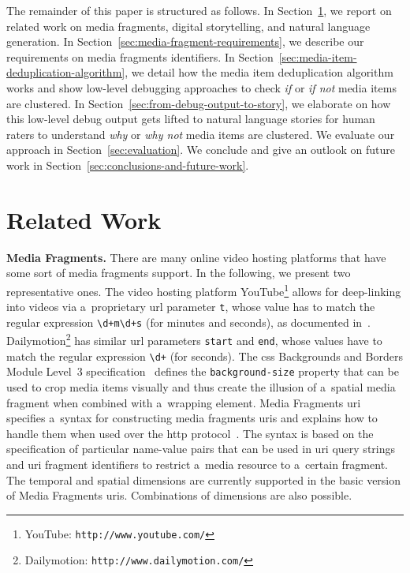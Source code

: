 \documentclass{article}
\begin{document}
The remainder of this paper is structured as follows. In Section~\ref{sec:related-work}, we report on related work on media fragments, digital storytelling, and natural language generation. In Section~\ref{sec:media-fragment-requirements}, we describe our requirements on media fragments identifiers. In Section~\ref{sec:media-item-deduplication-algorithm}, we detail how the media item deduplication algorithm works and show low-level debugging approaches to check
\emph{if} or \emph{if not} media items are clustered. In Section~\ref{sec:from-debug-output-to-story}, we elaborate on how this low-level debug output gets lifted
to natural language stories for human raters to understand \emph{why} or \emph{why not} media items are clustered. We evaluate our approach in Section~\ref{sec:evaluation}. We conclude and give an outlook on future work in Section~\ref{sec:conclusions-and-future-work}.


\section{Related Work}
\label{sec:related-work}
\textbf{Media Fragments.} There are many online video hosting platforms that have some sort of media fragments support. In the following, we present two representative ones. The video hosting platform YouTube\footnote{YouTube: \texttt{http://www.youtube.com/}} allows for deep-linking into videos via a~proprietary {\sc url} parameter \texttt{t}, whose value has to match the regular expression \texttt{\textbackslash d+m\textbackslash d+s} (for minutes and seconds),
as documented in~\cite{youtube2008link}. Dailymotion\footnote{Dailymotion: \texttt{http://www.dailymotion.com/}} has similar {\sc url} parameters \texttt{start} and \texttt{end}, whose values have to match the regular expression \texttt{\textbackslash d+} (for seconds). The {\sc css} Backgrounds and Borders Module Level~3 specification~\cite{bos2012css3} defines the \texttt{background-size} property that can be used to crop media items visually and thus create the illusion of a~spatial media fragment when combined with a~wrapping element. Media Fragments {\sc uri}~\cite{troncy2012mediafragments} specifies a~syntax for constructing media fragments {\sc uri}s and explains how to handle them when used over the {\sc http} protocol~\cite{fielding1999http}. The syntax is based on the specification of particular name-value pairs that can be used in {\sc uri} query strings and {\sc uri} fragment identifiers to restrict a~media resource to a~certain fragment. The temporal and spatial dimensions are currently supported in the basic version of Media Fragments {\sc uri}s. Combinations of dimensions are also possible.
\end{document}
